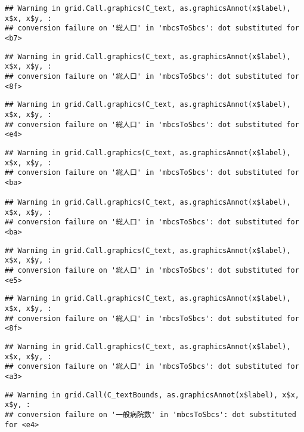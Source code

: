\documentclass[
]{article}
\begin{document}
\begin{verbatim}
## Warning in grid.Call.graphics(C_text, as.graphicsAnnot(x$label), x$x, x$y, :
## conversion failure on '総人口' in 'mbcsToSbcs': dot substituted for <b7>
\end{verbatim}

\begin{verbatim}
## Warning in grid.Call.graphics(C_text, as.graphicsAnnot(x$label), x$x, x$y, :
## conversion failure on '総人口' in 'mbcsToSbcs': dot substituted for <8f>
\end{verbatim}

\begin{verbatim}
## Warning in grid.Call.graphics(C_text, as.graphicsAnnot(x$label), x$x, x$y, :
## conversion failure on '総人口' in 'mbcsToSbcs': dot substituted for <e4>
\end{verbatim}

\begin{verbatim}
## Warning in grid.Call.graphics(C_text, as.graphicsAnnot(x$label), x$x, x$y, :
## conversion failure on '総人口' in 'mbcsToSbcs': dot substituted for <ba>

## Warning in grid.Call.graphics(C_text, as.graphicsAnnot(x$label), x$x, x$y, :
## conversion failure on '総人口' in 'mbcsToSbcs': dot substituted for <ba>
\end{verbatim}

\begin{verbatim}
## Warning in grid.Call.graphics(C_text, as.graphicsAnnot(x$label), x$x, x$y, :
## conversion failure on '総人口' in 'mbcsToSbcs': dot substituted for <e5>
\end{verbatim}

\begin{verbatim}
## Warning in grid.Call.graphics(C_text, as.graphicsAnnot(x$label), x$x, x$y, :
## conversion failure on '総人口' in 'mbcsToSbcs': dot substituted for <8f>
\end{verbatim}

\begin{verbatim}
## Warning in grid.Call.graphics(C_text, as.graphicsAnnot(x$label), x$x, x$y, :
## conversion failure on '総人口' in 'mbcsToSbcs': dot substituted for <a3>
\end{verbatim}

\begin{verbatim}
## Warning in grid.Call(C_textBounds, as.graphicsAnnot(x$label), x$x, x$y, :
## conversion failure on '一般病院数' in 'mbcsToSbcs': dot substituted for <e4>
\end{verbatim}
\end{document}
